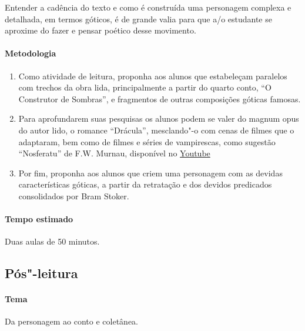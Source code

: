 \documentclass[12pt]{extarticle}
\begin{document}
Entender a cadência do texto e como é construída uma personagem complexa e detalhada, em 
termos góticos, é de grande valia para que a/o estudante se aproxime do fazer e pensar poético 
desse movimento. 

\paragraph{Metodologia}

\begin{enumerate}
\item
Como atividade de leitura, proponha aos alunos que estabeleçam paralelos com trechos da obra
lida, principalmente a partir do quarto conto, ``O Construtor de Sombras'', e fragmentos de outras 
composições góticas famosas. 

\item
Para aprofundarem suas pesquisas os alunos podem se valer do magnum opus do autor lido, o romance 
``Drácula'', mesclando"-o com cenas de filmes que o adaptaram, bem como de filmes e séries de
vampirescas, como sugestão ``Nosferatu'' de F.W. Murnau, disponível no \href{https://www.youtube.com/watch?v=FC6jFoYm3xs&ab_channel=TimelessClassicMovies}{Youtube}


\item
Por fim, proponha aos alunos que criem uma personagem com as devidas características góticas, 
a partir da retratação e dos devidos predicados consolidados por Bram Stoker.
 
\end{enumerate}

\paragraph{Tempo estimado} Duas aulas de 50 minutos. 

\subsection{Pós"-leitura}


\paragraph{Tema} Da personagem ao conto e coletânea. 
\end{document}
